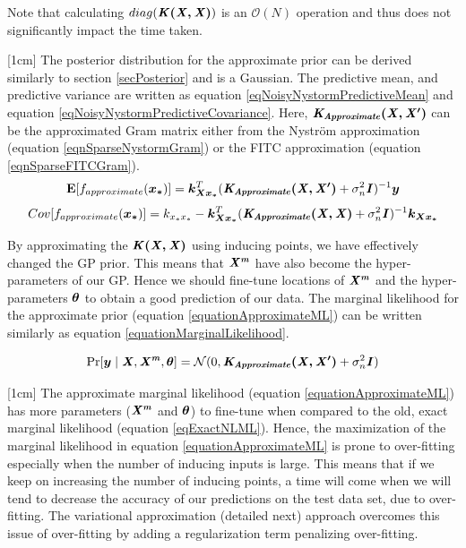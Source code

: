 Note that calculating $diag(\bm{\mathit{K(X, X)}})$ is an $\mathcal{O}\left ( N \right )$ operation and thus does not significantly impact the time taken. 

[1cm]
The posterior distribution for the approximate prior can be derived similarly to section \ref{secPosterior} \cite{williams2001using} and is a Gaussian. The predictive mean, and predictive variance are written as equation \ref{eqNoisyNystormPredictiveMean} and equation \ref{eqNoisyNystormPredictiveCovariance}. Here, $\bm{\mathit{K_{Approximate}(X, X')}}$ can be the approximated Gram matrix either from the Nystr\"{o}m approximation (equation \ref{eqnSparseNystormGram}) or the FITC approximation (equation \ref{eqnSparseFITCGram}). 
\begin{equation}\label{eqNoisyNystormPredictiveMean}
  \mathbf{E}[f_{approximate}(\boldsymbol{x_{*}})] = \boldsymbol{k_{Xx_{*}}}^{T}( \bm{\mathit{K_{Approximate}(X, X')}} + \sigma^{2}_{n}\bm{\mathit{I}})^{-1} \boldsymbol{y}
  \end{equation}
\begin{equation}\label{eqNoisyNystormPredictiveCovariance}
	Cov[f_{approximate}(\boldsymbol{x_{*}})] = k_{x_{*}x_{*}} - \boldsymbol{k_{Xx_{*}}}^{T}( \bm{\mathit{K_{Approximate}(X, X)}} + \sigma^{2}_{n}\bm{\mathit{I}} )^{-1} \boldsymbol{k_{Xx_{*}}}
  \end{equation}


By approximating the $\bm{\mathit{K(X, X)}}$ using inducing points, we have effectively changed the GP prior. This means that $\bm{\mathit{X^{m}}}$ have also become the hyper-parameters of our GP. Hence we should fine-tune locations of $\bm{\mathit{X^{m}}}$ and the hyper-parameters $\boldsymbol{\theta}$ to obtain a good prediction of our data. The marginal likelihood for the approximate prior (equation \ref{equationApproximateML}) can be written similarly as equation \ref{equationMarginalLikelihood}.

\begin{equation}\label{equationApproximateML}
    \Pr[\boldsymbol{y} \mid \bm{\mathit{X}}, \bm{\mathit{X^{m}}}, \boldsymbol{\theta}] = \mathcal{N}(0 , \bm{\mathit{K_{Approximate}(X, X')}} + \sigma^{2}_{n}\bm{\mathit{I}})
\end{equation}

[1cm]
The approximate marginal likelihood (equation \ref{equationApproximateML}) has more parameters ($\bm{\mathit{X^{m}}}$ and $\boldsymbol{\theta}$) to fine-tune when compared to the old, exact marginal likelihood (equation \ref{eqExactNLML}). Hence, the maximization of the marginal likelihood in equation \ref{equationApproximateML} is prone to over-fitting especially when the number of inducing inputs is large. This means that if we keep on increasing the number of inducing points, a time will come when we will tend to decrease the accuracy of our predictions on the test data set, due to over-fitting. The variational approximation (detailed next) approach overcomes this issue of over-fitting by adding a regularization term penalizing over-fitting.

